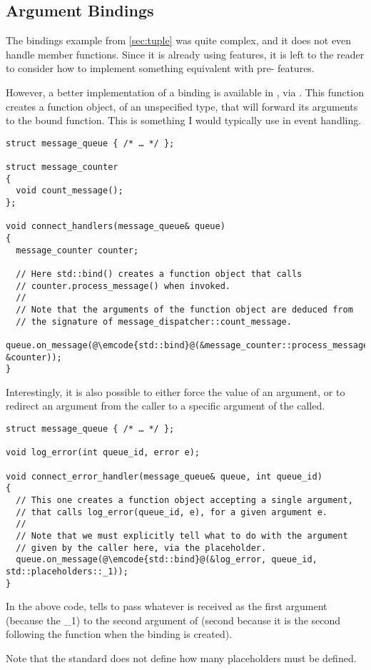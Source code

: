 \subsection{Argument Bindings}

The bindings example from \ref{sec:tuple} was quite complex, and it
does not even handle member functions. Since it is already using
 features, it is left to the reader to consider how to implement
something equivalent with pre- features.

%
%
However, a better implementation of a binding is available in ,
via . This function creates a function object, of an
unspecified type, that will forward its arguments to the bound
function. This is something I would typically use in event handling.

\begin{lstlisting}
struct message_queue { /* … */ };

struct message_counter
{
  void count_message();
};

void connect_handlers(message_queue& queue)
{
  message_counter counter;

  // Here std::bind() creates a function object that calls
  // counter.process_message() when invoked.
  //
  // Note that the arguments of the function object are deduced from
  // the signature of message_dispatcher::count_message.
  queue.on_message(@\emcode{std::bind}@(&message_counter::process_message, &counter));
}
\end{lstlisting}

Interestingly, it is also possible to either force the value of an
argument, or to redirect an argument from the caller to a specific
argument of the called.

\begin{lstlisting}
struct message_queue { /* … */ };

void log_error(int queue_id, error e);

void connect_error_handler(message_queue& queue, int queue_id)
{
  // This one creates a function object accepting a single argument,
  // that calls log_error(queue_id, e), for a given argument e.
  //
  // Note that we must explicitly tell what to do with the argument
  // given by the caller here, via the placeholder.
  queue.on_message(@\emcode{std::bind}@(&log_error, queue_id, std::placeholders::_1));
}
\end{lstlisting}

In the above code,  tells
 to pass whatever is received as the first argument
(because the \_1) to the second argument of  (second
because it is the second following the function when the binding is
created).

Note that the standard does not define how many placeholders must be
defined.
